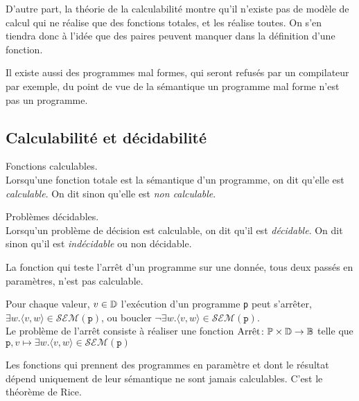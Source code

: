     D'autre part, la théorie de la calculabilité montre qu'il n'existe pas de modèle de calcul qui ne réalise que des fonctions totales, et les réalise toutes. On s'en tiendra donc à l'idée que des paires peuvent manquer dans la définition d'une fonction.\par
    Il existe aussi des programmes mal formes, qui seront refusés par un compilateur par exemple, du point de vue de la sémantique un programme mal forme n'est pas un programme.\par

    \subsection{Calculabilité et décidabilité}
    \begin{definition}
        Fonctions calculables.\\
        Lorsqu'une fonction totale est la sémantique d'un programme, on dit qu'elle est \emph{calculable}. On dit sinon qu'elle est \emph{non calculable}.
    \end{definition}
        \begin{definition}
        Problèmes décidables.\\
        Lorsqu'un problème de décision est calculable, on dit qu'il est \emph{décidable}. On dit sinon qu'il est \emph{indécidable} ou non décidable.
    \end{definition}
    \begin{result}
        La fonction qui teste l'arrêt d'un programme sur une donnée, tous deux passés en paramètres, n'est pas calculable. \autocite{turing1936}
    \end{result}
    \begin{definition}
            Pour chaque valeur, \(v\in\mathbb{D}\) l'exécution d'un programme \texttt{p} peut s'arrêter, \(\exists w.\langle v,w\rangle\in\mathcal{SEM}(\texttt{p})\), ou boucler \(\lnot\exists w.\langle v,w\rangle\in\mathcal{SEM}(\texttt{p})\).\\
            Le problème de l'arrêt consiste à réaliser une fonction \(\text{Arr\^et}\colon\mathbb{P}\times\mathbb{D}\rightarrow\mathbb{B}\) telle que \(\texttt{p},v\mapsto\exists w.\langle v,w\rangle\in\mathcal{SEM}(\texttt{p})\)
    \end{definition}
    \begin{result}
        Les fonctions qui prennent des programmes en paramètre et dont le résultat dépend uniquement de leur sémantique ne sont jamais calculables. C'est le théorème de Rice.\autocite{rice1953}
    \end{result}
